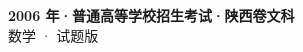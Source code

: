 \documentclass[zihao=-4, a4paper]{ctexart}
\begin{document}
\begin{center}
  {\Large\bfseries 2006 年·普通高等学校招生考试·陕西卷文科}\\[4pt]
  {\large 数学 · 试题版}
\end{center}
\medskip
{}

\end{document}
